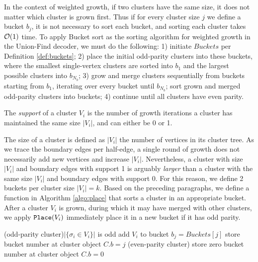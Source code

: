 In the context of weighted growth, if two clusters have the same size, it does not matter which cluster is grown first. Thus if for every cluster size $j$ we define a bucket $b_j$, it is not necessary to sort each bucket, and sorting each cluster takes $\mathcal{O}(1)$ time. To apply Bucket sort as the sorting algorithm for weighted growth in the Union-Find decoder, we must do the following: 1) initiate $Buckets$ per Definition \ref{def:buckets}; 2) place the initial odd-parity clusters into these buckets, where the smallest single-vertex clusters are sorted into $b_1$ and the largest possible clusters into $b_{N_b}$; 3) grow and merge clusters sequentially from buckets starting from $b_1$, iterating over every bucket until $b_{N_b}$; sort grown and merged odd-parity clusters into buckets; 4) continue until all clusters have even parity. 
\begin{definition}\label{def:clustersupport}
  The \emph{support} of a cluster $V_i$ is the number of growth iterations a cluster has maintained the same size $|V_i|$, and can either be 0 or 1. 
\end{definition}
The size of a cluster is defined as $|V_i|$ the number of vertices in its cluster tree. As we trace the boundary edges per half-edge, a single round of growth does not necessarily add new vertices and increase $|V_i|$. Nevertheless, a cluster with size $|V_i|$ and boundary edges with support 1 is arguably \emph{larger} than a cluster with the same size $|V_i|$ and boundary edges with support 0. For this reason, we define 2 buckets per cluster size $|V_i|=k$. Based on the preceding paragraphs, we define a function  in Algorithm \ref{algo:place} that sorts a cluster in an appropriate bucket. After a cluster $V_i$ is grown, during which it may have merged with other clusters, we apply $\texttt{Place}(V_i)$ immediately place it in a new bucket if it has odd parity. 

\begin{algorithm}[h]
  \BlankLine
  \BlankLine

  \uIf(odd-parity cluster){$|\{\sigma_i \in V_i \}|$ is odd}{
    add $V_i$ to bucket $b_j = Buckets[j]$\;
    store bucket number at cluster object $C.b = j$\;
  }
  \Else(even-parity cluster){
    store zero bucket number at cluster object $C.b = 0$\;
  }
  \BlankLine
  \caption{}\label{algo:place}
\end{algorithm}

